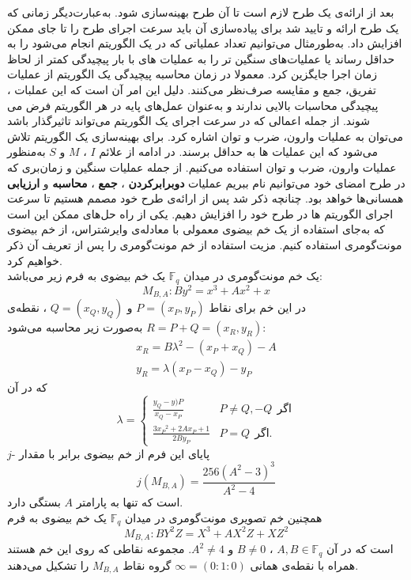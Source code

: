 بعد از ارائه‌ی یک طرح لازم است تا آن طرح بهینه‌سازی شود. به‌عبارت‌دیگر زمانی که یک طرح ارائه و تایید شد برای پیاده‌سازی آن باید سرعت اجرای طرح را تا جای ممکن افزایش داد. به‌طورمثال می‌توانیم تعداد عملیاتی که در یک الگوریتم انجام می‌شود را به حداقل رساند یا عملیات‌های سنگین تر را به عملیات های با بار پیچیدگی کمتر از لحاظ زمان اجرا جایگزین کرد.
معمولا در  زمان محاسبه پیچیدگی یک الگوریتم از عملیات تفریق، جمع و مقایسه صرف‌نظر می‌کنند. دلیل این امر آن است که  این عملبات ، پیچیدگی محاسبات بالایی ندارند و به‌عنوان عمل‌های پایه‌ در  هر الگوریتم فرض می شوند. از جمله اعمالی که در سرعت اجرای یک الگوریتم می‌تواند تاثیرگذار باشد می‌توان به  عملیات وارون، ضرب و توان اشاره  کرد.  برای بهینه‌سازی یک الگوریتم تلاش می‌شود که این عملیات ‌ها به حداقل برسند. در ادامه  از علائم
$I$
،
$M$
و
$S$
به‌منظور عملیات وارون، ضرب و توان استفاده می‌کنیم. 
از جمله عملیات سنگین و زمان‌بری که در طرح امضای خود می‌توانیم نام ببریم عملیات 
\textbf{دوبرابرکردن}
، 
\textbf{جمع}
، 
\textbf{محاسبه}
 و 
\textbf{ارزیابی}
 همسانی‌ها خواهد بود.
چنانچه ذکر شد پس از ارائه‌ی طرح خود مصمم هستیم تا سرعت اجرای الگوریتم ها در طرح خود را افزایش دهیم. یکی از راه حل‌های ممکن این است که به‌جای استفاده از یک خم بیضوی معمولی با معادله‌ی وایرشتراس، از خم بیضوی مونت‌گومری استفاده کنیم. مزیت استفاده از خم مونت‌گومری را پس از تعریف آن ذکر خواهیم کرد.
\\
یک خم مونت‌گومری در میدان 
$\mathbb{F}_q$
یک خم بیضوی به فرم زیر می‌باشد:
$$ M_{B,A} : By^2 = x^3 + Ax^2 + x $$
در این خم برای نقاط
$P = (x_P,y_P)$
و
$Q = (x_Q, y_Q)$
، نقطه‌‌ی
$R = P+Q = (x_R,y_R)$
به‌صورت زیر محاسبه می‌شود:
\[
\begin{gathered}
x_R = B{\lambda}^2 - (x_P + x_Q) - A \\
y_R = {\lambda}(x_P-x_Q)-y_P
\end{gathered}
\]
که در آن
\[
\lambda = 
\begin{cases}
\frac{y_Q-y)P}{x_Q-x_P} & P \ne Q,-Q ~~\text{اگر} \\
\frac{3{x_P}^2 + 2Ax_P+1}{2By_P}  & P = Q  ~~\text{اگر}.
\end{cases}
\]
$j$-
پایای این فرم از خم بیضوی برابر با مقدار
$$ j(M_{B,A}) = \frac{256{(A^2-3)}^3}{A^2-4} $$
است که تنها به پارامتر
$A$
بستگی دارد.
\\
همچنین خم تصویری مونت‌گومری در میدان 
$\mathbb{F}_q$
یک خم بیضوی به فرم
$$ M_{B,A} : BY^2Z = X^3+AX^2Z + XZ^2 $$
است که در آن
$A,B \in \mathbb{F}_q$
،
$B \ne 0$
و
$A^2 \ne 4$.
مجموعه نقاطی که روی این خم هستند همراه با نقطه‌ی همانی
$ \infty = (0:1:0) $
گروه نقاط
$M_{B,A}$
را تشکیل می‌دهند.
\\

